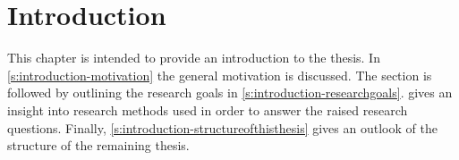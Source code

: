 
\chapter{Introduction}\label{c:introduction}

This chapter is intended to provide an introduction to the thesis.
In \cref{s:introduction-motivation} the general motivation is discussed.
The section is followed by outlining the research goals in \cref{s:introduction-researchgoals}.
 gives an insight into research methods used in order to answer the raised research questions.
Finally, \cref{s:introduction-structureofthisthesis} gives an outlook of the structure of the remaining thesis.

